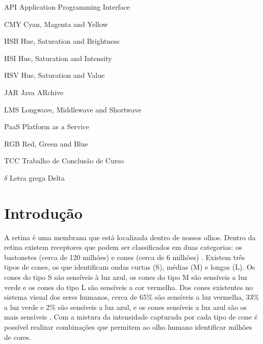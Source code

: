 \documentclass[	12pt, Times, openright, twoside, a4paper, english, brazil]{abntex2}
\begin{document}
\listoffigures*
\cleardoublepage

\listoftables*
\cleardoublepage


\begin{siglas}
  \item[API] Application Programming Interface
  \item[CMY] Cyan, Magenta and Yellow
  \item[HSB] Hue, Saturation and Brightness
  \item[HSI] Hue, Saturation and Intensity
  \item[HSV] Hue, Saturation and Value
  \item[JAR] Java ARchive
  \item[LMS] Longwave, Middlewave and Shortwave
  \item[PaaS] Platform as a Service
  \item[RGB] Red, Green and Blue
  \item[TCC] Trabalho de Conclusão de Curso
  

\end{siglas}

\begin{simbolos}
  \item[$ \delta $] Letra grega Delta
\end{simbolos}

\tableofcontents*
\cleardoublepage

\textual

\chapter{Introdução}

A retina é uma membrana que está localizada dentro de nossos olhos. Dentro da retina existem receptores que podem ser classificados em duas categorias: os bastonetes (cerca de 120 milhões) e cones (cerca de 6 milhões) \cite{koschan2008}. Existem três tipos de cones, os que identificam ondas curtas (S), médias (M) e longas (L). Os cones do tipo S são sensíveis à luz azul, os cones do tipo M são sensíveis a luz verde e os cones do tipo L são sensíveis a cor vermelha. Dos cones existentes no sistema visual dos seres humanos, cerca de 65\% são sensíveis a luz vermelha, 33\% a luz verde e 2\% são sensíveis a luz azul, e os cones sensíveis a luz azul são os mais sensíveis \cite{gonzalez2008}. Com a mistura da intensidade capturada por cada tipo de cone é possível realizar combinações que permitem ao olho humano identificar milhões de cores.
\end{document}
